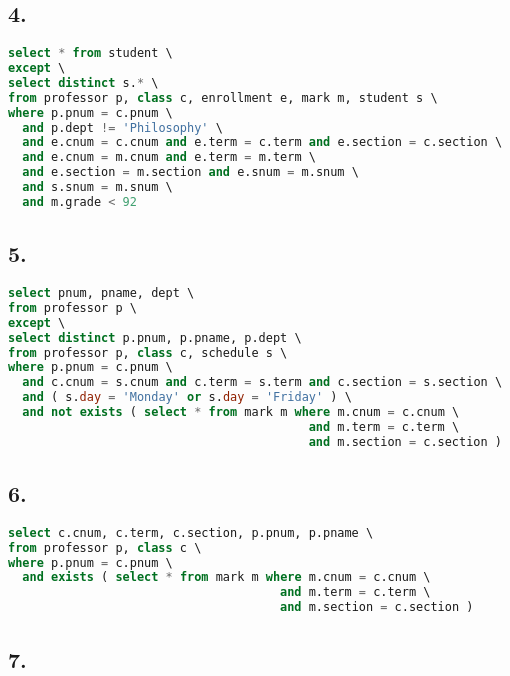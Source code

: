 \documentclass[12pt]{article}
\begin{document}
\subsection*{4.}

\begin{lstlisting}[language=sql]
select * from student \
except \
select distinct s.* \
from professor p, class c, enrollment e, mark m, student s \
where p.pnum = c.pnum \
  and p.dept != 'Philosophy' \
  and e.cnum = c.cnum and e.term = c.term and e.section = c.section \
  and e.cnum = m.cnum and e.term = m.term \
  and e.section = m.section and e.snum = m.snum \
  and s.snum = m.snum \
  and m.grade < 92
\end{lstlisting}
\vspace{1em}
\subsection*{5.}

\begin{lstlisting}[language=sql]
select pnum, pname, dept \
from professor p \
except \
select distinct p.pnum, p.pname, p.dept \
from professor p, class c, schedule s \
where p.pnum = c.pnum \
  and c.cnum = s.cnum and c.term = s.term and c.section = s.section \
  and ( s.day = 'Monday' or s.day = 'Friday' ) \
  and not exists ( select * from mark m where m.cnum = c.cnum \
                                          and m.term = c.term \
                                          and m.section = c.section )
\end{lstlisting}
\vspace{1em}
\subsection*{6.}

\begin{lstlisting}[language=sql]
select c.cnum, c.term, c.section, p.pnum, p.pname \
from professor p, class c \
where p.pnum = c.pnum \
  and exists ( select * from mark m where m.cnum = c.cnum \
                                      and m.term = c.term \
                                      and m.section = c.section )
\end{lstlisting}
\vspace{1em}
\pagebreak  %
\subsection*{7.}
\end{document}
